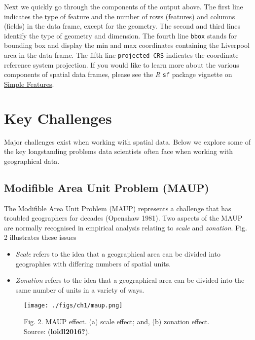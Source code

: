 \documentclass[
  letterpaper,
  krantz2]{style/krantz}
\begin{document}
Next we quickly go through the components of the output above. The first
line indicates the type of feature and the number of rows (features) and
columns (fields) in the data frame, except for the geometry. The second
and third lines identify the type of geometry and dimension. The fourth
line \texttt{bbox} stands for bounding box and display the min and max
coordinates containing the Liverpool area in the data frame. The fifth
line \texttt{projected\ CRS} indicates the coordinate reference system
projection. If you would like to learn more about the various components
of spatial data frames, please see the \emph{R} \texttt{sf} package
vignette on
\href{https://r-spatial.github.io/sf/articles/sf1.html}{Simple
Features}.

\hypertarget{key-challenges}{%
\section{Key Challenges}\label{key-challenges}}

Major challenges exist when working with spatial data. Below we explore
some of the key longstanding problems data scientists often face when
working with geographical data.

\hypertarget{modifible-area-unit-problem-maup}{%
\subsection{Modifible Area Unit Problem
(MAUP)}\label{modifible-area-unit-problem-maup}}

The Modifible Area Unit Problem (MAUP) represents a challenge that has
troubled geographers for decades (Openshaw 1981). Two aspects of the
MAUP are normally recognised in empirical analysis relating to
\emph{scale} and \emph{zonation}. Fig. 2 illustrates these issues

\begin{itemize}
\item
  \emph{Scale} refers to the idea that a geographical area can be
  divided into geographies with differing numbers of spatial units.
\item
  \emph{Zonation} refers to the idea that a geographical area can be
  divided into the same number of units in a variety of ways.
\end{itemize}

\begin{figure}

{\centering \texttt{[image: ./figs/ch1/maup.png]}

}

\caption{Fig. 2. MAUP effect. (a) scale effect; and, (b) zonation
effect. Source: (\textbf{loidl2016?}).}

\end{figure}
\end{document}
